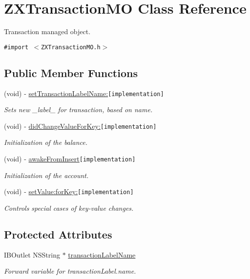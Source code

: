 \hypertarget{interface_z_x_transaction_m_o}{
\section{ZXTransactionMO Class Reference}
\label{interface_z_x_transaction_m_o}
}
Transaction managed object.  


{\tt \#import $<$ZXTransactionMO.h$>$}

\subsection*{Public Member Functions}
\begin{CompactItemize}
\item 
(void) - \hyperlink{interface_z_x_transaction_m_o_faa2aa9521435114abca89cb0bbd23e5}{setTransactionLabelName:}{\tt  \mbox{[}implementation\mbox{]}}
\begin{CompactList}\small\item\em Sets new \_\-label\_\- for transaction, based on name. \item\end{CompactList}\item 
(void) - \hyperlink{interface_z_x_transaction_m_o_e9fe1fcc56305cf1457db7404eb485dc}{didChangeValueForKey:}{\tt  \mbox{[}implementation\mbox{]}}
\begin{CompactList}\small\item\em Initialization of the balance. \item\end{CompactList}\item 
(void) - \hyperlink{interface_z_x_transaction_m_o_a2f4e9d356ac363d2cee7ad11ec990b0}{awakeFromInsert}{\tt  \mbox{[}implementation\mbox{]}}
\begin{CompactList}\small\item\em Initialization of the account. \item\end{CompactList}\item 
(void) - \hyperlink{interface_z_x_transaction_m_o_146047cdc02454b553bfcbbeb5b200ba}{setValue:forKey:}{\tt  \mbox{[}implementation\mbox{]}}
\begin{CompactList}\small\item\em Controls special cases of key-value changes. \item\end{CompactList}\end{CompactItemize}
\subsection*{Protected Attributes}
\begin{CompactItemize}
\item 
IBOutlet NSString $\ast$ \hyperlink{interface_z_x_transaction_m_o_1aa04c3a4903ba99f666a55868cd8d5a}{transactionLabelName}
\begin{CompactList}\small\item\em Forward variable for transactionLabel.name. \item\end{CompactList}\end{CompactItemize}


